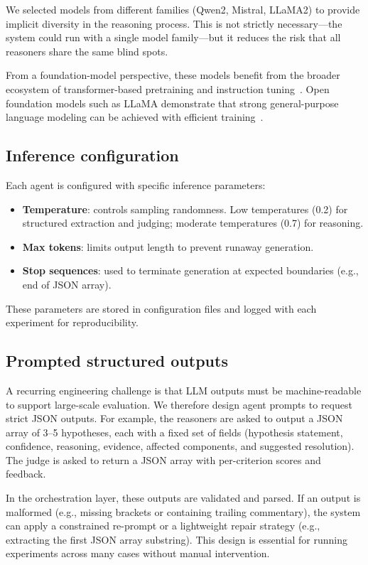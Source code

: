We selected models from different families (Qwen2, Mistral, LLaMA2) to provide implicit diversity
in the reasoning process. This is not strictly necessary---the system could run with a single
model family---but it reduces the risk that all reasoners share the same blind spots.

From a foundation-model perspective, these models benefit from the broader ecosystem of
transformer-based pretraining and instruction
tuning~\cite{vaswani2023attentionneed,ouyang2022traininglanguagemodelsfollow}. Open foundation
models such as LLaMA demonstrate that strong general-purpose language modeling can be achieved with
efficient training~\cite{touvron2023llamaopenefficientfoundation}.

\subsection{Inference configuration}
Each agent is configured with specific inference parameters:
\begin{itemize}
  \item \textbf{Temperature}: controls sampling randomness. Low temperatures (0.2) for structured
        extraction and judging; moderate temperatures (0.7) for reasoning.
  \item \textbf{Max tokens}: limits output length to prevent runaway generation.
  \item \textbf{Stop sequences}: used to terminate generation at expected boundaries (e.g., end
        of JSON array).
\end{itemize}

These parameters are stored in configuration files and logged with each experiment for
reproducibility.

\subsection{Prompted structured outputs}
A recurring engineering challenge is that LLM outputs must be machine-readable to support
large-scale evaluation. We therefore design agent prompts to request strict JSON outputs. For
example, the reasoners are asked to output a JSON array of 3--5 hypotheses, each with a fixed set
of fields (hypothesis statement, confidence, reasoning, evidence, affected components, and
suggested resolution). The judge is asked to return a JSON array with per-criterion scores and
feedback.

In the orchestration layer, these outputs are validated and parsed. If an output is malformed
(e.g., missing brackets or containing trailing commentary), the system can apply a constrained
re-prompt or a lightweight repair strategy (e.g., extracting the first JSON array substring). This
design is essential for running experiments across many cases without manual intervention.

